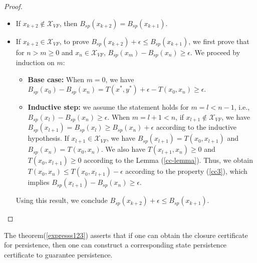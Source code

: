\documentclass[acmlarge]{acmart}
\begin{document}
\begin{proof}
\begin{itemize}
\begin{itemize}
        \begin{itemize}
            \item If \( x_{k+2} \notin \mathcal{X}_{VF} \), then \( B_{sp}(x_{k+2}) = B_{sp}(x_{k+1}) \).
            \item If \( x_{k+2} \in \mathcal{X}_{VF} \), to prove \( B_{sp}(x_{k+2}) + \epsilon \leq B_{sp}(x_{k+1}) \), we first prove that for \( n > m \geq 0 \) and \( x_n \in \mathcal{X}_{VF} \), \( B_{sp}(x_m) - B_{sp}(x_n) \geq \epsilon \). We proceed by induction on $m$:
            \begin{itemize}
                \item \textbf{Base case:} When $m=0$, we have \( B_{sp}(x_0) - B_{sp}(x_n) = T(x^*, y^*) + \epsilon - T(x_0, x_n) \geq \epsilon \).
                \item \textbf{Inductive step:} we assume the statement holds for \( m = l < n-1\), i.e., \( B_{sp}(x_l) - B_{sp}(x_n) \geq \epsilon \). When $m = l+1 < n$,
                     if \( x_{l+1} \notin \mathcal{X}_{VF} \), we have \( B_{sp}(x_{l+1}) = B_{sp}(x_l) \geq B_{sp}(x_n) + \epsilon \) according to the inductive hypothesis.
                     If \( x_{l+1} \in \mathcal{X}_{VF} \), we have \( B_{sp}(x_{l+1}) = T(x_0, x_{l+1}) \) and \( B_{sp}(x_n) = T(x_0, x_n) \). We also have \( T(x_{l+1}, x_n) \geq 0 \) and \( T(x_0, x_{l+1}) \geq 0 \) according to the Lemma (\ref{cc-lemma}). Thus, we obtain \( T(x_0, x_n) \leq T(x_0, x_{l+1}) - \epsilon \) according to the property (\ref{cc3}), which implies \( B_{sp}(x_{l+1}) - B_{sp}(x_n) \geq \epsilon \).
            \end{itemize}
            Using this result, we conclude \( B_{sp}(x_{k+2}) + \epsilon \leq B_{sp}(x_{k+1}) \).
        \end{itemize}
    \end{itemize}
\end{itemize}
\end{proof}


The theorem(\ref{expresss123}) asserts that if one can obtain the closure certificate for persistence, then one can construct a corresponding state persistence certificate to guarantee persistence.
\end{document}

